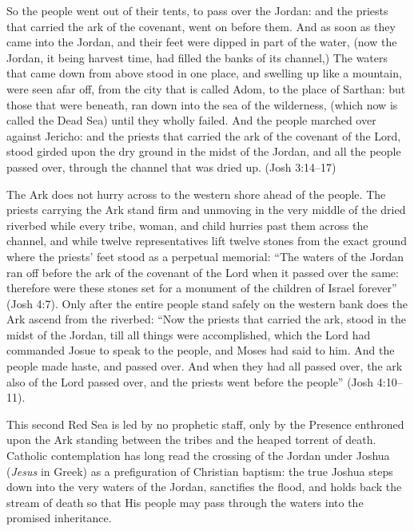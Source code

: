 \begin{scriptureblock}
So the people went out of their tents, to pass over the Jordan: and the priests that carried the ark of the covenant, went on before them. And as soon as they came into the Jordan, and their feet were dipped in part of the water, (now the Jordan, it being harvest time, had filled the banks of its channel,) The waters that came down from above stood in one place, and swelling up like a mountain, were seen afar off, from the city that is called Adom, to the place of Sarthan: but those that were beneath, ran down into the sea of the wilderness, (which now is called the Dead Sea) until they wholly failed. And the people marched over against Jericho: and the priests that carried the ark of the covenant of the Lord, stood girded upon the dry ground in the midst of the Jordan, and all the people passed over, through the channel that was dried up. \textnormal{(Josh 3:14--17)}
\end{scriptureblock}

The Ark does not hurry across to the western shore ahead of the people. The priests carrying the Ark stand firm and unmoving in the very middle of the dried riverbed while every tribe, woman, and child hurries past them across the channel, and while twelve representatives lift twelve stones from the exact ground where the priests' feet stood as a perpetual memorial: ``The waters of the Jordan ran off before the ark of the covenant of the Lord when it passed over the same: therefore were these stones set for a monument of the children of Israel forever'' (Josh 4:7). Only after the entire people stand safely on the western bank does the Ark ascend from the riverbed: ``Now the priests that carried the ark, stood in the midst of the Jordan, till all things were accomplished, which the Lord had commanded Josue to speak to the people, and Moses had said to him. And the people made haste, and passed over. And when they had all passed over, the ark also of the Lord passed over, and the priests went before the people'' (Josh 4:10--11).

This second Red Sea is led by no prophetic staff, only by the Presence enthroned upon the Ark standing between the tribes and the heaped torrent of death. Catholic contemplation has long read the crossing of the Jordan under Joshua (\textit{Jesus} in Greek) as a prefiguration of Christian baptism: the true Joshua steps down into the very waters of the Jordan, sanctifies the flood, and holds back the stream of death so that His people may pass through the waters into the promised inheritance.

